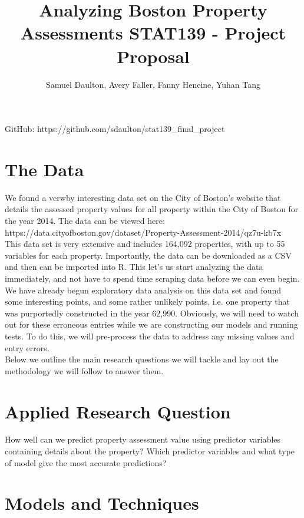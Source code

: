 \documentclass[12pt]{article}
\author{Samuel Daulton, Avery Faller, Fanny Heneine, Yuhan Tang}
\title{Analyzing Boston Property Assessments STAT139 - Project Proposal}
\begin{document}
\maketitle
\begin{center}
GitHub: https://github.com/sdaulton/stat139\_final\_project
\end{center}

\newpage
\section*{The Data}
We found a verwby interesting data set on the City of Boston's website that details the assessed property values for all property within the City of Boston for the year 2014.  The data can be viewed here: \\ https://data.cityofboston.gov/dataset/Property-Assessment-2014/qz7u-kb7x \\

\noindent This data set is very extensive and includes 164,092 properties, with up to 55 variables for each property.  Importantly, the data can be downloaded as a CSV and then can be imported into R.  This let's us start analyzing the data immediately, and not have to spend time scraping data before we can even begin. \\

\noindent We have already begun exploratory data analysis on this data set and found some interesting points, and some rather unlikely points, i.e. one property that was purportedly constructed in the year 62,990.  Obviously, we will need to watch out for these erroneous entries while we are constructing our models and running tests. To do this, we will pre-process the data to address any missing values and entry errors. \\

\noindent Below we outline the main research questions we will tackle and lay out the methodology we will follow to answer them.

\section*{Applied Research Question}
How well can we predict property assessment value using predictor variables containing details about the property?  Which predictor variables and what type of model give the most accurate predictions?

\section*{Models and Techniques}
\end{document}
